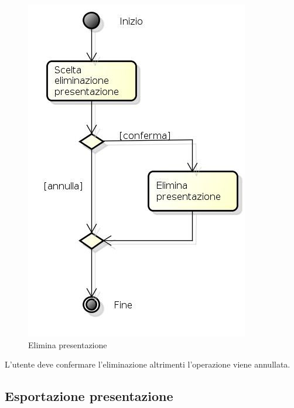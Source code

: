 \begin{figure}[h!]
		\centering
		\includegraphics[scale=.5]{img/attivita/Elimina_presentazione.jpg}
		\caption{Elimina presentazione}
		\label{fig:Elimina_presentazione}
\end{figure}  

L'utente deve confermare l'eliminazione altrimenti l'operazione viene annullata.

\newpage

\subsection{Esportazione presentazione}

